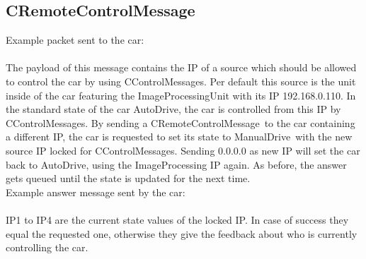 \subsection*{CRemoteControlMessage}
Example packet sent to the car:\\
 \\
\newline
\newline
The payload of this message contains the IP of a source which should be allowed to control the car by using \glqq CControlMessages\grqq . Per default this source is the unit inside of the car featuring the ImageProcessingUnit with its IP 192.168.0.110. In the standard state of the car \glqq AutoDrive\grqq , the car is controlled from this IP by \glqq CControlMessages\grqq . By sending a \glqq CRemoteControlMessage\grqq \ to the car containing a different IP, the car is requested to set its state to \glqq ManualDrive\grqq \ with the new source IP locked for \glqq CControlMessages\grqq . Sending 0.0.0.0 as new IP will set the car back to \glqq AutoDrive\grqq , using the ImageProcessing IP again.
As before, the answer gets queued until the state is updated for the next time.\\
\newline
Example answer message sent by the car:\\
\\
\newline
IP1 to IP4 are the current state values of the locked IP. In case of success they equal the requested one, otherwise they give the feedback about who is currently controlling the car.


